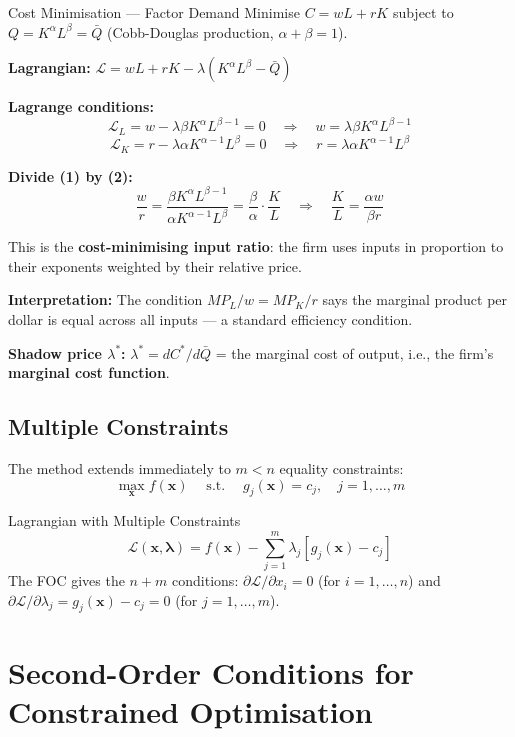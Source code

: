 \documentclass[12pt, a4paper]{article}
\theoremstyle{definition}
\newcommand{\bx}{\mathbf{x}}
\newcommand{\st}{\;\text{s.t.}\;}
\begin{document}
\newpage
\begin{exbox}{Cost Minimisation --- Factor Demand}
Minimise $C = wL + rK$ subject to $Q = K^\alpha L^\beta = \bar Q$
(Cobb-Douglas production, $\alpha+\beta=1$).

\textbf{Lagrangian:}
$\mathcal{L} = wL + rK - \lambda(K^\alpha L^\beta - \bar Q)$

\textbf{Lagrange conditions:}
\[
  \mathcal{L}_L = w - \lambda\beta K^\alpha L^{\beta-1} = 0
  \quad\Rightarrow\quad
  w = \lambda\beta K^\alpha L^{\beta-1} \tag{1}
\]
\[
  \mathcal{L}_K = r - \lambda\alpha K^{\alpha-1}L^\beta = 0
  \quad\Rightarrow\quad
  r = \lambda\alpha K^{\alpha-1}L^\beta \tag{2}
\]

\textbf{Divide (1) by (2):}
\[
  \frac{w}{r} = \frac{\beta K^\alpha L^{\beta-1}}{\alpha K^{\alpha-1}L^\beta}
              = \frac{\beta}{\alpha}\cdot\frac{K}{L}
  \quad\Rightarrow\quad
  \frac{K}{L} = \frac{\alpha w}{\beta r}
\]

This is the \textbf{cost-minimising input ratio}: the firm uses inputs in
proportion to their exponents weighted by their relative price.

\textbf{Interpretation:} The condition $MP_L/w = MP_K/r$ says the marginal
product per dollar is equal across all inputs --- a standard efficiency
condition.

\textbf{Shadow price $\lambda^*$:}
$\lambda^* = dC^*/d\bar Q$ = the marginal cost of output, i.e., the firm's
\textbf{marginal cost function}.
\end{exbox}

\subsection{Multiple Constraints}

The method extends immediately to $m < n$ equality constraints:
\[
  \max_\bx f(\bx) \quad\st\quad g_j(\bx) = c_j, \quad j = 1,\ldots,m
\]

\begin{defbox}{Lagrangian with Multiple Constraints}
\[
  \mathcal{L}(\bx, \boldsymbol{\lambda})
  = f(\bx) - \sum_{j=1}^m \lambda_j [g_j(\bx) - c_j]
\]
The FOC gives the $n+m$ conditions:
$\partial\mathcal{L}/\partial x_i = 0$ (for $i=1,\ldots,n$) and
$\partial\mathcal{L}/\partial\lambda_j = g_j(\bx) - c_j = 0$
(for $j=1,\ldots,m$).
\end{defbox}

\section{Second-Order Conditions for Constrained Optimisation}
\end{document}
